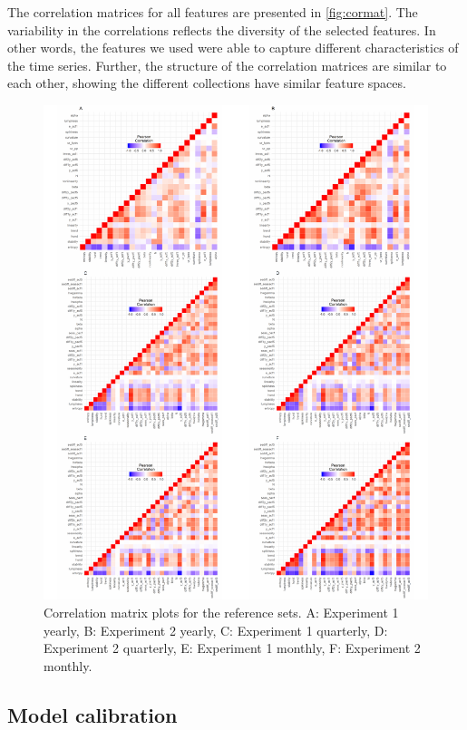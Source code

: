 \documentclass[11pt,a4paper,]{article}
\theoremstyle{definition}
\theoremstyle{definition}
\theoremstyle{definition}
\theoremstyle{remark}
\begin{document}
The correlation matrices for all features are presented in
\autoref{fig:cormat}. The variability in the correlations reflects the
diversity of the selected features. In other words, the features we used
were able to capture different characteristics of the time series.
Further, the structure of the correlation matrices are similar to each
other, showing the different collections have similar feature spaces.

\begin{figure}

{\centering \includegraphics[width=\textwidth]{figure/cormat-1} 

}

\caption{ Correlation matrix plots for the reference sets. A: Experiment 1 yearly, B: Experiment 2 yearly, C: Experiment 1 quarterly, D: Experiment 2 quarterly, E: Experiment 1 monthly, F: Experiment 2 monthly.}\label{fig:cormat}
\end{figure}

\subsection{Model calibration}\label{model-calibration}
\end{document}
